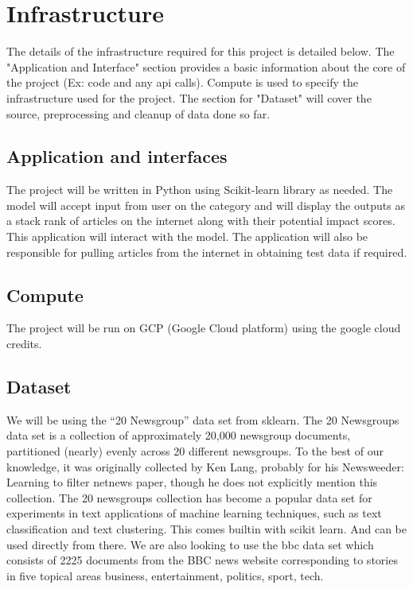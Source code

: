\documentclass{article}
\begin{document}
 

\section{Infrastructure} %
The details of the infrastructure required for this project is detailed below. The "Application and Interface" section provides a basic information about
the core of the project (Ex: code and any api calls). Compute is used to specify the infrastructure used for the project. The section for "Dataset" will cover
the source, preprocessing and cleanup of data done so far.

\subsection{Application and interfaces}
The project will be written in Python using Scikit-learn library as needed. \newline
The model will accept input from user on the category and will display the outputs as a stack rank of articles on the internet along with their potential impact scores. \newline
This application will interact with the model. \newline
The application will also be responsible for pulling articles from the internet in obtaining test data if required.

\subsection{Compute}
The project will be run on GCP (Google Cloud platform) using the google cloud credits.

\subsection{Dataset}
We will be using the “20 Newsgroup” data set from sklearn. The 20 Newsgroups data set is a collection of approximately 20,000 newsgroup documents, partitioned (nearly) evenly across 20 different newsgroups. \newline
To the best of our knowledge, it was originally collected by Ken Lang, probably for his Newsweeder: Learning to filter netnews paper, though he does not explicitly mention this collection.
The 20 newsgroups collection has become a popular data set for experiments in text applications of machine learning techniques, such as text classification and text clustering. This comes builtin with scikit learn. And can be used directly from there. \newline
We are also looking to use the bbc data set which consists of 2225 documents from the BBC news website corresponding to stories in five topical areas business, entertainment, politics, sport, tech.
\end{document}
